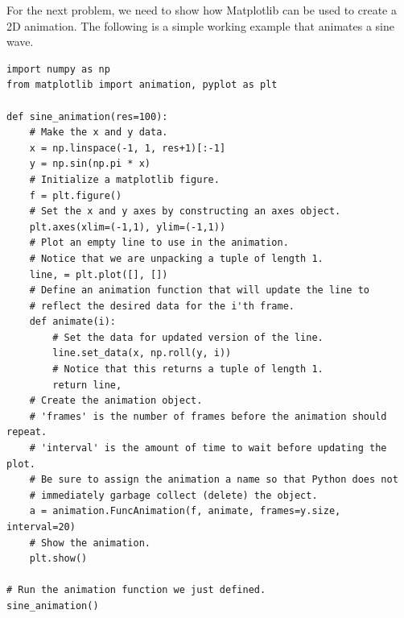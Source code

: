 For the next problem, we need to show how Matplotlib can be used to create a 2D animation.
The following is a simple working example that animates a sine wave.


\begin{lstlisting}
import numpy as np
from matplotlib import animation, pyplot as plt

def sine_animation(res=100):
    # Make the x and y data.
    x = np.linspace(-1, 1, res+1)[:-1]
    y = np.sin(np.pi * x)
    # Initialize a matplotlib figure.
    f = plt.figure()
    # Set the x and y axes by constructing an axes object.
    plt.axes(xlim=(-1,1), ylim=(-1,1))
    # Plot an empty line to use in the animation.
    # Notice that we are unpacking a tuple of length 1.
    line, = plt.plot([], [])
    # Define an animation function that will update the line to
    # reflect the desired data for the i'th frame.
    def animate(i):
        # Set the data for updated version of the line.
        line.set_data(x, np.roll(y, i))
        # Notice that this returns a tuple of length 1.
        return line,
    # Create the animation object.
    # 'frames' is the number of frames before the animation should repeat.
    # 'interval' is the amount of time to wait before updating the plot.
    # Be sure to assign the animation a name so that Python does not
    # immediately garbage collect (delete) the object.
    a = animation.FuncAnimation(f, animate, frames=y.size, interval=20)
    # Show the animation.
    plt.show()

# Run the animation function we just defined.
sine_animation()
\end{lstlisting}

